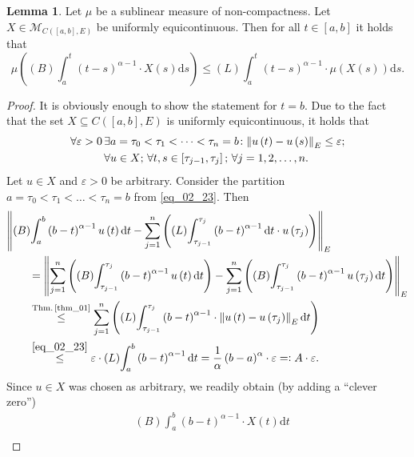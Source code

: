 \documentclass[reqno]{amsart}
\numberwithin{equation}{section}
\theoremstyle{definition}
\newtheorem{lemma}{Lemma}
\theoremstyle{remark}
\newcommand{\Bint}[3]{\br{B}\!\displaystyle\int_{#1}^{#2}{#3}}
\newcommand{\br}[1]{\left(#1\right)}
\newcommand{\C}[2]{C\br{#1,#2}}
\newcommand{\ds}{\mathrm{d}s}
\newcommand{\dt}{\mathrm{d}t}
\newcommand{\eps}{\varepsilon}
\newcommand{\eqdef}{=\vcentcolon}
\newcommand{\fM}{\mathcal{M}}
\newcommand{\leqText}[1]{\stackrel{#1}{\leq}}
\newcommand{\Lint}[3]{\br{L}\!\displaystyle\int_{#1}^{#2}{#3}}
\newcommand{\sbr}[1]{\left[#1\right]}
\newcommand{\st}{\!:}
\newcommand{\thmRef}[1]{\textrm{Thm.\,\ref{#1}}}
\begin{document}
	\begin{lemma}\label{lm_03}
		Let $\mu$ be a sublinear measure of non-compactness. Let $X\in\fM_{\C{\sbr{a,b}}{E}}$ be uniformly equicontinuous. Then for all $t\in\sbr{a,b}$ it holds that
		\begin{equation}\label{eq_02_22}
			\mu\br{\Bint{a}{t}{\br{t-s}^{\alpha-1}\cdot{X}\br{s}\ds}}\leq\Lint{a}{t}{\br{t-s}^{\alpha-1}\cdot\mu\br{X\br{s}}\ds}.
		\end{equation}
	\end{lemma}
	\begin{proof}
	It is obviously enough to show the statement for $t=b$. Due to the fact that the set $X\subseteq\C{\sbr{a,b}}{E}$ is uniformly equicontinuous, it holds that
	\begin{equation}\label{eq_02_23}
		\begin{aligned}
			\forall\eps>0\,&\exists{a}=\tau_0<\tau_1<\dots<\tau_n=b\st\norm{u\br{t}-u\br{s}}_E\leq\eps;\\
			&\forall{u}\in{X};\,\forall{t},s\in\sbr{\tau_{j-1},\tau_j};\,\forall{j}=1,2,\dots,n.
		\end{aligned}
	\end{equation}
	Let $u\in{X}$ and $\eps>0$ be arbitrary. Consider the partition $a=\tau_0<\tau_1<\dots<\tau_n=b$ from \eqref{eq_02_23}. Then
	\begin{equation}\label{eq_02_24}
		\begin{aligned}
			&\norm{\Bint{a}{b}{\br{b-t}^{\alpha-1}u\br{t}\dt}-\sum_{j=1}^n\br{\Lint{\tau_{j-1}}{\tau_j}{\br{b-t}^{\alpha-1}\dt}\cdot{u}\br{\tau_j}}}_E\\
			&\qquad=\norm{\sum_{j=1}^n\br{\Bint{\tau_{j-1}}{\tau_j}{\br{b-t}^{\alpha-1}u\br{t}\dt}}-\sum_{j=1}^n\br{\Bint{\tau_{j-1}}{\tau_j}{\br{b-t}^{\alpha-1}u\br{\tau_j}\dt}}}_E\\
			&\qquad\leqText{\thmRef{thm_01}}\sum_{j=1}^n\br{\Lint{\tau_{j-1}}{\tau_j}{\br{b-t}^{\alpha-1}\cdot\norm{u\br{t}-u\br{\tau_j}}_E\,\dt}}\\
			&\qquad\leqText{\eqref{eq_02_23}}\eps\cdot\Lint{a}{b}{\br{b-t}^{\alpha-1}\dt}=\frac{1}{\alpha}\br{b-a}^{\alpha}\cdot\eps\eqdef{A}\cdot\eps.
		\end{aligned}
	\end{equation}
	Since $u\in{X}$ was chosen as arbitrary, we readily obtain (by adding a \enquote{clever zero})
	\begin{equation*}
		\begin{aligned}
			&\Bint{a}{b}{\br{b-t}^{\alpha-1}\cdot{X}\br{t}\dt}\\

\end{aligned}
\end{equation*}
\end{proof}
\end{document}
